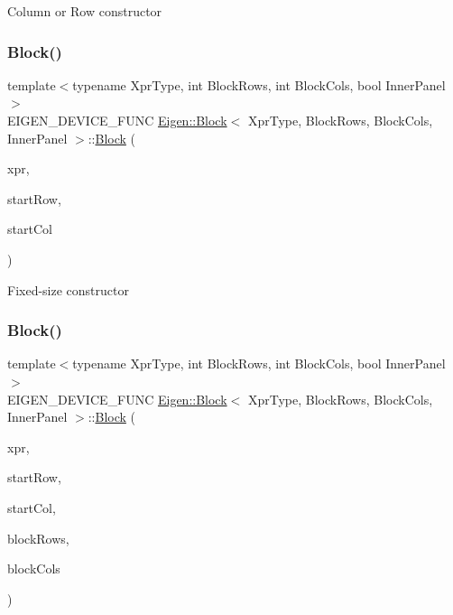 Column or Row constructor \mbox{\label{class_eigen_1_1_block_afdf396b628ef3874414bbfc4ebd72ab4}} 
\subsubsection{\texorpdfstring{Block()}{Block()}\hspace{0.1cm}{\footnotesize\ttfamily [2/3]}}
{\footnotesize\ttfamily template$<$typename Xpr\+Type, int Block\+Rows, int Block\+Cols, bool Inner\+Panel$>$ \\
E\+I\+G\+E\+N\+\_\+\+D\+E\+V\+I\+C\+E\+\_\+\+F\+U\+NC \mbox{\hyperlink{class_eigen_1_1_block}{Eigen\+::\+Block}}$<$ Xpr\+Type, Block\+Rows, Block\+Cols, Inner\+Panel $>$\+::\mbox{\hyperlink{class_eigen_1_1_block}{Block}} (\begin{DoxyParamCaption}\item[{Xpr\+Type \&}]{xpr,  }\item[{Index}]{start\+Row,  }\item[{Index}]{start\+Col }\end{DoxyParamCaption})\hspace{0.3cm}{\ttfamily [inline]}}

Fixed-\/size constructor \mbox{\label{class_eigen_1_1_block_a09e495968e1c52a5838bfd102978e09e}} 
\subsubsection{\texorpdfstring{Block()}{Block()}\hspace{0.1cm}{\footnotesize\ttfamily [3/3]}}
{\footnotesize\ttfamily template$<$typename Xpr\+Type, int Block\+Rows, int Block\+Cols, bool Inner\+Panel$>$ \\
E\+I\+G\+E\+N\+\_\+\+D\+E\+V\+I\+C\+E\+\_\+\+F\+U\+NC \mbox{\hyperlink{class_eigen_1_1_block}{Eigen\+::\+Block}}$<$ Xpr\+Type, Block\+Rows, Block\+Cols, Inner\+Panel $>$\+::\mbox{\hyperlink{class_eigen_1_1_block}{Block}} (\begin{DoxyParamCaption}\item[{Xpr\+Type \&}]{xpr,  }\item[{Index}]{start\+Row,  }\item[{Index}]{start\+Col,  }\item[{Index}]{block\+Rows,  }\item[{Index}]{block\+Cols }\end{DoxyParamCaption})\hspace{0.3cm}{\ttfamily [inline]}}

